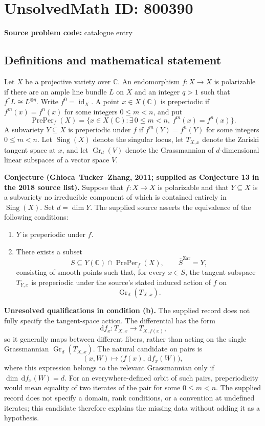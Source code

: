 \documentclass[11pt]{article}
\newcommand{\C}{\mathbb{C}}
\newcommand{\dd}{\,\mathrm{d}}
\begin{document}
\section*{UnsolvedMath ID: 800390}
\textbf{Source problem code:} catalogue entry
\subsection{Definitions and mathematical statement}
Let \(X\) be a projective variety over \(\C\). An endomorphism \(f\colon X\to X\) is polarizable if there are an ample line bundle \(L\) on \(X\) and an integer \(q>1\) such that \(f^{*}L\cong L^{\otimes q}\). Write \(f^0=\operatorname{id}_X\). A point \(x\in X(\C)\) is preperiodic if \(f^m(x)=f^n(x)\) for some integers \(0\leq m<n\), and put
\[
\operatorname{PrePer}_f(X)=\{x\in X(\C):\exists\,0\leq m<n,\ f^m(x)=f^n(x)\}.
\]
A subvariety \(Y\subseteq X\) is preperiodic under \(f\) if \(f^m(Y)=f^n(Y)\) for some integers \(0\leq m<n\). Let \(\operatorname{Sing}(X)\) denote the singular locus, let \(T_{X,x}\) denote the Zariski tangent space at \(x\), and let \(\operatorname{Gr}_d(V)\) denote the Grassmannian of \(d\)-dimensional linear subspaces of a vector space \(V\).

\textbf{Conjecture (Ghioca--Tucker--Zhang, 2011; supplied as Conjecture 13 in the 2018 source list).} Suppose that \(f\colon X\to X\) is polarizable and that \(Y\subseteq X\) is a subvariety no irreducible component of which is contained entirely in \(\operatorname{Sing}(X)\). Set \(d=\dim Y\). The supplied source asserts the equivalence of the following conditions:
\begin{enumerate}
\item[(a)] \(Y\) is preperiodic under \(f\).
\item[(b)] There exists a subset
\[
S\subseteq Y(\C)\cap\operatorname{PrePer}_f(X),\qquad \overline{S}^{\mathrm{Zar}}=Y,
\]
consisting of smooth points such that, for every \(x\in S\), the tangent subspace \(T_{Y,x}\) is preperiodic under the source's stated induced action of \(f\) on
\[
\operatorname{Gr}_{d}(T_{X,x}).
\]
\end{enumerate}

\textbf{Unresolved qualifications in condition (b).} The supplied record does not fully specify the tangent-space action. The differential has the form
\[
\dd f_x\colon T_{X,x}\longrightarrow T_{X,f(x)},
\]
so it generally maps between different fibers, rather than acting on the single Grassmannian \(\operatorname{Gr}_d(T_{X,x})\). The natural candidate on pairs is
\[
(x,W)\longmapsto\bigl(f(x),\dd f_x(W)\bigr),
\]
where this expression belongs to the relevant Grassmannian only if \(\dim\dd f_x(W)=d\). For an everywhere-defined orbit of such pairs, preperiodicity would mean equality of two iterates of the pair for some \(0\leq m<n\). The supplied record does not specify a domain, rank conditions, or a convention at undefined iterates; this candidate therefore explains the missing data without adding it as a hypothesis.
\end{document}
